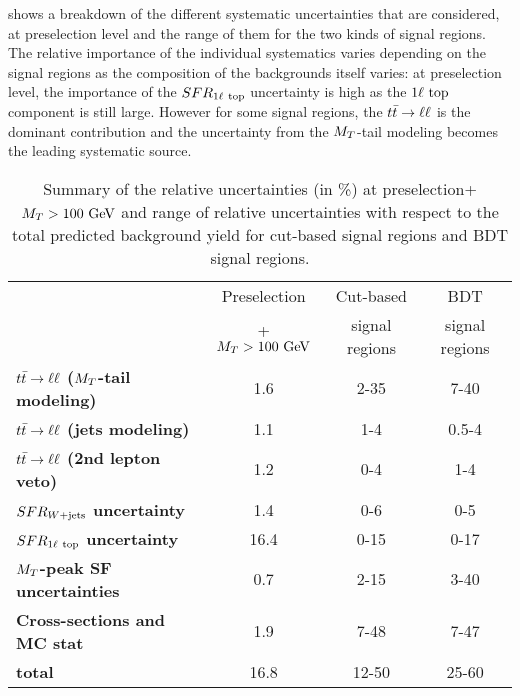      shows a breakdown of the different systematic
    uncertainties that are considered, at preselection level and the range of them
    for the two kinds of signal regions. The relative importance of the individual
    systematics varies depending on the signal regions as the composition of the
    backgrounds itself varies: at preselection level, the importance of the
    $SFR_{1\ell~\text{top}}$ uncertainty is high as the $1\ell~\text{top}$ component is still large.
    However for some signal regions, the $t\bar{t} \rightarrow \ell \ell$ is the dominant contribution and
    the uncertainty from the $M_T$-tail modeling becomes the leading systematic source.


    \begin{table}[!ht]
    \begin{center}
    \begin{tabular}{|l|c|cc|}
        \hline
                                                       & Preselection    & Cut-based      & BDT             \\
                                                       & + $M_T>100~\text{GeV}$ & signal regions & signal regions  \\
        \hline
        \textbf{$t\bar{t} \rightarrow \ell \ell$ ($M_T$-tail modeling)}  & 1.6                      & 2-35         & 7-40    \\
        \textbf{$t\bar{t} \rightarrow \ell \ell$ (jets modeling)}        & 1.1                      & 1-4          & 0.5-4   \\
        \textbf{$t\bar{t} \rightarrow \ell \ell$ (2nd lepton veto)}      & 1.2                      & 0-4          & 1-4     \\
        \textbf{$SFR_{\text{$W$+jets}}$ uncertainty}               & 1.4                      & 0-6          & 0-5     \\
        \textbf{$SFR_{1\ell~\text{top}}$ uncertainty}        & 16.4                     & 0-15         & 0-17    \\
        \textbf{$M_T$-peak SF uncertainties}           & 0.7                      & 2-15         & 3-40    \\
        \textbf{Cross-sections and MC stat}            & 1.9                      & 7-48         & 7-47    \\
        \hline
        \textbf{total}                                 & 16.8                     & 12-50        & 25-60   \\
        \hline
    \end{tabular}
    \caption{Summary of the relative uncertainties (in \%) at preselection+$M_T>100~\text{GeV}$
    and range of relative uncertainties with respect to the total predicted
    background yield for cut-based signal regions and BDT signal regions.
    \label{tab:systematicsSummary}}
    \end{center}
    \end{table}

